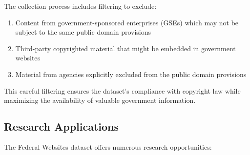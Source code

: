 The collection process includes filtering to exclude:

\begin{enumerate}
    \item Content from government-sponsored enterprises (GSEs) which may not be subject to the same public domain provisions
    \item Third-party copyrighted material that might be embedded in government websites
    \item Material from agencies explicitly excluded from the public domain provisions
\end{enumerate}

This careful filtering ensures the dataset's compliance with copyright law while maximizing the availability of valuable government information.

\subsection{Research Applications}

The Federal Websites dataset offers numerous research opportunities:

